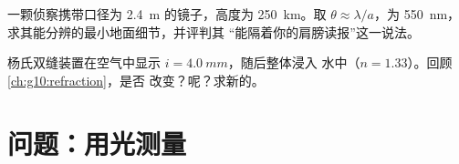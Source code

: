 \begin{exercise}[$\star\star\star$]\label{exo:g12:light-as-wave:14}
一颗侦察携带口径为 \qty{2.4}{m} 的镜子，高度为
\qty{250}{km}。取 $\theta \approx \lambda/a$，为 \qty{550}{nm}，
求其能分辨的最小地面细节，并评判其
“能隔着你的肩膀读报”这一说法。
\end{exercise}

\begin{exercise}[$\star\star\star$]\label{exo:g12:light-as-wave:15}
杨氏双缝装置在空气中显示 $i = \qty{4.0}{mm}$，随后整体浸入
水中（$n = 1.33$）。回顾\cref{ch:g10:refraction}，是否
改变？呢？求新的。
\end{exercise}

\section{问题：用光测量}

